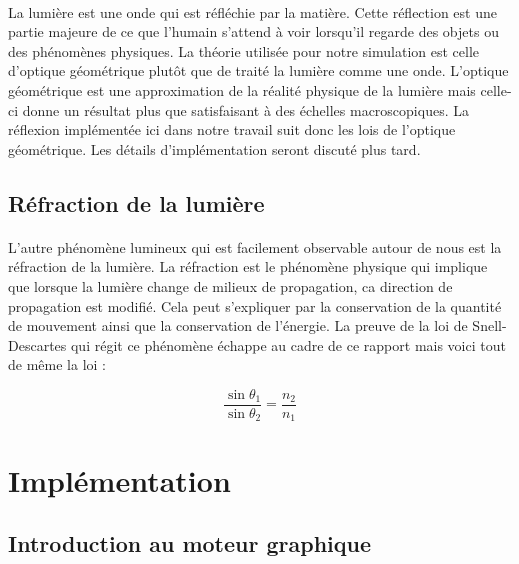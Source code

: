 \documentclass[a4paper, 12pt]{article} %
\begin{document}
        \paragraph{}
	La lumière est une onde qui est réfléchie par la matière. Cette réflection est une partie majeure de ce que l'humain s'attend à
	voir lorsqu'il regarde des objets ou des phénomènes physiques. La théorie utilisée pour notre simulation est celle d'optique
	géométrique plutôt que de traité la lumière comme une onde. L'optique géométrique est une approximation de la réalité physique 
	de la lumière mais celle-ci donne un résultat plus que satisfaisant à des échelles macroscopiques. La réflexion implémentée ici 
	dans notre travail suit donc les lois de l'optique géométrique. Les détails d'implémentation seront discuté plus tard.

    \subsection{Réfraction de la lumière}
        \paragraph{}
	L'autre phénomène lumineux qui est facilement observable autour de nous est la réfraction de la lumière. La réfraction est 
	le phénomène physique qui implique que lorsque la lumière change de milieux de propagation, ca direction de propagation 
	est modifié. Cela peut s'expliquer par la conservation de la quantité de mouvement ainsi que la conservation de l'énergie.
	La preuve de la loi de Snell-Descartes qui régit ce phénomène échappe au cadre de ce rapport mais voici tout de même la loi :

	\begin{equation}
            \frac {\sin \theta_{1}} {\sin \theta_{2}} = \frac {n_{2}} {n_{1}}
	\end{equation}


\section{Implémentation}
\subsection{Introduction au moteur graphique}
\end{document}
